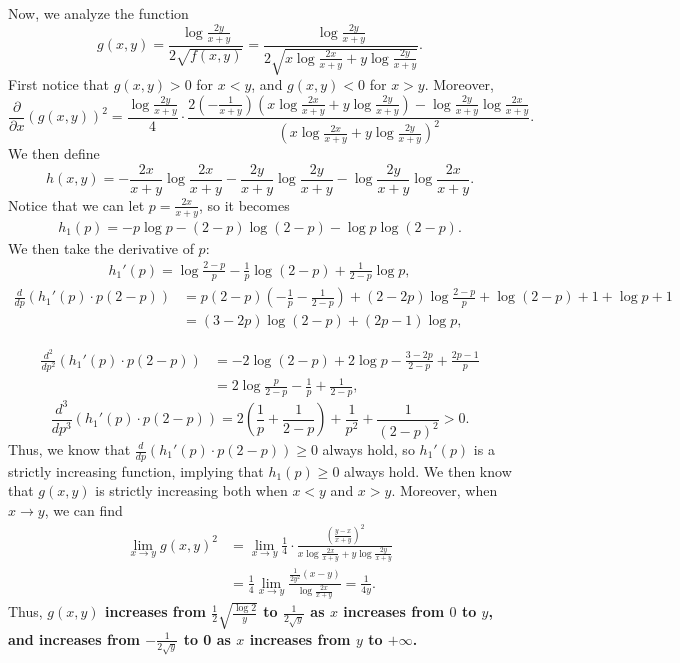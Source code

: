 \documentclass[a4 paper,12pt]{article}
\begin{document}
Now, we analyze the function 
\[
g(x,y)=\frac{\log \frac{2y}{x+y}}{2\sqrt{f(x,y)}}=\frac{\log \frac{2y}{x+y}}{2\sqrt{x\log \frac{2x}{x+y}+y\log \frac{2y}{x+y}}}.
\] First notice that $g(x,y)>0$ for $x<y$, and $g(x,y)<0$ for $x>y$. Moreover,
\[
\frac{\partial }{\partial x}(g(x,y))^2=\frac{\log \frac{2y}{x+y}}{4}\cdot \frac{2\left(-\frac{1}{x+y}\right)\left(x\log \frac{2x}{x+y}+y\log \frac{2y}{x+y}\right)-\log \frac{2y}{x+y}\log \frac{2x}{x+y}}{\left(x\log \frac{2x}{x+y}+y\log \frac{2y}{x+y}\right)^2}	.
\] We then define
\[
h(x,y)=-\frac{2x}{x+y}\log \frac{2x}{x+y}-\frac{2y}{x+y}\log \frac{2y}{x+y}-\log \frac{2y}{x+y}\log \frac{2x}{x+y}.
\] Notice that we can let $p=\frac{2x}{x+y}$, so it becomes
\begin{align*}
h_1(p)=-p\log p-(2-p)\log (2-p)-\log p\log (2-p).
\end{align*}
We then take the derivative of $p$:
\begin{gather*}
h_1'(p)=\log \frac{2-p}{p}-\frac{1}{p}\log (2-p)+\frac{1}{2-p}\log p,
\end{gather*}
\begin{align*}
\frac{d}{dp}\left(h_1'(p)\cdot p(2-p)\right)&=p(2-p)\left(-\frac{1}{p}-\frac{1}{2-p}\right)+(2-2p)\log \frac{2-p}{p}+\log (2-p)+1+\log p+1\\
&=(3-2p)\log (2-p)+(2p-1)\log p,
\end{align*}

\begin{align*}
\frac{d^2}{dp^2}\left(h_1'(p)\cdot p(2-p)\right)&=-2\log (2-p)+2\log p-\frac{3-2p}{2-p}+\frac{2p-1}{p}\\
&=2\log \frac{p}{2-p}-\frac{1}{p}+\frac{1}{2-p},
\end{align*}
\[
\frac{d^3}{dp^3}\left(h_1'(p)\cdot p(2-p)\right)=2\left(\frac{1}{p}+\frac{1}{2-p}\right)+\frac{1}{p^2}+\frac{1}{(2-p)^2}>0.
\]
Thus, we know that $\frac{d}{dp}\left(h_1'(p)\cdot p(2-p)\right)\ge 0$ always hold, so $h_1'(p)$ is a strictly increasing function, implying that $h_1(p)\ge 0$ always hold. We then know that $g(x,y)$ is strictly increasing both when $x<y$ and $x>y$. Moreover, when $x\to y$, we can find
\begin{align*}
\lim_{x\to y}g(x,y)^2&=\lim_{x\to y}\frac{1}{4}\cdot \frac{\left(\frac{y-x}{x+y}\right)^2}{x\log \frac{2x}{x+y}+y\log \frac{2y}{x+y}}\\
&=\frac{1}{4}\lim_{x\to y}\frac{\frac{1}{2y^2}(x-y)}{\log \frac{2x}{x+y}}=\frac{1}{4y}.
\end{align*} Thus, \textbf{$g(x,y)$ increases from $\frac{1}{2}\sqrt{\frac{\log 2}{y}}$ to $\frac{1}{2\sqrt{y}}$ as $x$ increases from $0$ to $y$, and increases from $-\frac{1}{2\sqrt{y}}$ to 0 as $x$ increases from $y$ to $+\infty$.} 
\end{document}
